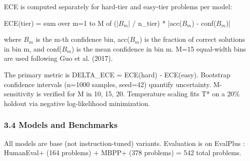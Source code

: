 ECE is computed separately for hard-tier and easy-tier problems per model:

ECE(tier) = sum over m=1 to M of (|$B_m$| / n\_tier) * |acc($B_m$) - conf($B_m$)|

where $B_m$ is the m-th confidence bin, acc($B_m$) is the fraction of correct solutions in bin m, and conf($B_m$) is the mean confidence in bin m. M=15 equal-width bins are used following Guo et al. (2017).

The primary metric is DELTA\_ECE = ECE(hard) - ECE(easy). Bootstrap confidence intervals (n=1000 samples, seed=42) quantify uncertainty. M-sensitivity is verified for M in {10, 15, 20}. Temperature scaling fits T* on a 20\% holdout via negative log-likelihood minimization.

\subsubsection{3.4 Models and Benchmarks}

\begin{table}[htbp]
\centering
{}
\end{table}

All models are base (not instruction-tuned) variants. Evaluation is on EvalPlus \citep{Liu2023EvalPlus}: HumanEval+ (164 problems) + MBPP+ (378 problems) = 542 total problems.

